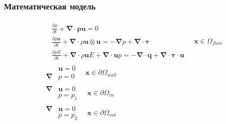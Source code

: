 \documentclass[10pt,xcolor={dvipsnames,table},aspectratio=169]{beamer}
\begin{document}
    \begin{frame}{}

        \justifying
        \normalsize

        \frametitle{Математическая модель}

        \[
            \begin{aligned}
                &\begin{aligned}
                    &\frac{\partial \rho}{\partial t} + \symbf{\nabla} \cdot \symbf{\rho u} = 0 \\
                    &\frac{\partial \rho \symbf{u}}{\partial t} + \symbf{\nabla} \cdot \rho \symbf{u} \otimes \symbf{u}
                    =
                    - \symbf{\nabla} p
                    + \symbf{\nabla} \cdot \symbf{\tau}\\
                    &\frac{\partial \rho E}{\partial t} + \symbf{\nabla} \cdot \rho \symbf{u} E + \symbf{\nabla} \cdot \symbf{u} p
                    =
                    - \symbf{\nabla} \cdot \symbf{q}
                    + \symbf{\nabla} \cdot \symbf{\tau \cdot \symbf{u}}
                \end{aligned} \quad \symbf{x} \in \Omega_{flow} \\
                &\begin{aligned}
                    &\symbf{u} = 0 \\
                    \symbf{\nabla} &p = 0
                \end{aligned} \quad \symbf{x} \in \partial \Omega_{wall} \\
                &\begin{aligned}
                    \symbf{\nabla} &\symbf{u} = 0 \\
                    &p = p_{1}
                \end{aligned} \quad \symbf{x} \in \partial \Omega_{in} \\
                &\begin{aligned}
                    \symbf{\nabla} &\symbf{u} = 0 \\
                    &p = p_{2}
                \end{aligned} \quad \symbf{x} \in \partial \Omega_{out}
            \end{aligned}
        \]

    \end{frame}{}
\end{document}
